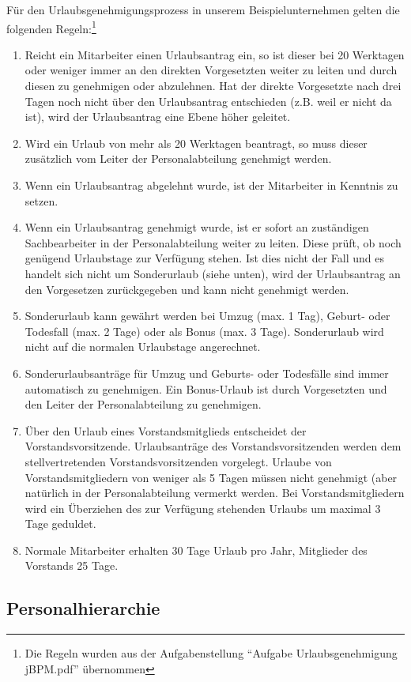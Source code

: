 Für den Urlaubsgenehmigungsprozess in unserem Beispielunternehmen gelten die folgenden Regeln:\footnote{Die Regeln wurden aus der Aufgabenstellung "`Aufgabe Urlaubsgenehmigung jBPM.pdf"' übernommen}
\begin{enumerate}
	\item Reicht ein Mitarbeiter einen Urlaubsantrag ein, so ist dieser bei 20 Werktagen oder weniger
	immer an den direkten Vorgesetzten weiter zu leiten und durch diesen zu genehmigen oder
	abzulehnen. Hat der direkte Vorgesetzte nach drei Tagen noch nicht über den Urlaubsantrag
	entschieden (z.B. weil er nicht da ist), wird der Urlaubsantrag eine Ebene höher geleitet.
	\item Wird ein Urlaub von mehr als 20 Werktagen beantragt, so muss dieser zusätzlich vom Leiter der
	Personalabteilung genehmigt werden.
	\item Wenn ein Urlaubsantrag abgelehnt wurde, ist der Mitarbeiter in Kenntnis zu setzen.
	\item Wenn ein Urlaubsantrag genehmigt wurde, ist er sofort an zuständigen Sachbearbeiter in der
	Personalabteilung weiter zu leiten. Diese prüft, ob noch genügend Urlaubstage zur Verfügung
	stehen. Ist dies nicht der Fall und es handelt sich nicht um Sonderurlaub (siehe unten), wird der
	Urlaubsantrag an den Vorgesetzen zurückgegeben und kann nicht genehmigt werden.
	\item Sonderurlaub kann gewährt werden bei Umzug (max. 1 Tag), Geburt- oder Todesfall (max. 2
	Tage) oder als Bonus (max. 3 Tage). Sonderurlaub wird nicht auf die normalen Urlaubstage
	angerechnet.
	\item Sonderurlaubsanträge für Umzug und Geburts- oder Todesfälle sind immer automatisch zu
	genehmigen. Ein Bonus-Urlaub ist durch Vorgesetzten und den Leiter der Personalabteilung zu
	genehmigen.
	\item Über den Urlaub eines Vorstandsmitglieds entscheidet der Vorstandsvorsitzende. Urlaubsanträge
	des Vorstandsvorsitzenden werden dem stellvertretenden Vorstandsvorsitzenden vorgelegt.
	Urlaube von Vorstandsmitgliedern von weniger als 5 Tagen müssen nicht genehmigt (aber
	natürlich in der Personalabteilung vermerkt werden. Bei Vorstandsmitgliedern wird ein
	Überziehen des zur Verfügung stehenden Urlaubs um maximal 3 Tage geduldet.
	\item Normale Mitarbeiter erhalten 30 Tage Urlaub pro Jahr, Mitglieder des Vorstands 25 Tage.
\end{enumerate}

\subsection{Personalhierarchie}
\label{Personalhierarchie}


